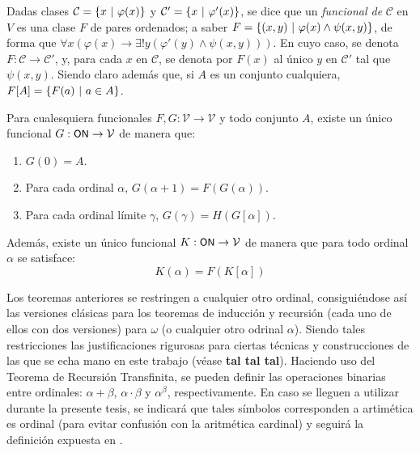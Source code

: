     Dadas clases $\mathcal{C}=\{x \text{ $|$ } \varphi(x)\}$ y $\mathcal{C}'=\{x \text{ $|$ } \varphi'(x)\}$, se dice que un \textit{funcional de} $\mathcal{C}$ en $V$ es una clase $F$ de pares ordenados; a saber $F=\{(x,y) \text{ $|$ } \varphi(x) \land \psi(x,y)\}$, de forma que $\forall x (\varphi(x)\to \exists! y (\varphi'(y) \land \psi(x,y))) $. En cuyo caso, se denota $F:\mathcal{C} \to \mathcal{C}'$, y, para cada $x$ en $\mathcal{C}$, se denota por $F(x)$ al único $y$ en $\mathcal{C}'$ tal que $\psi(x,y)$. Siendo claro además que, si $A$ es un conjunto cualquiera, $F[A]=\{F(a) \text{ $|$ } a \in A\}$.

    \begin{teorema}
        Para cualesquiera funcionales $F,G:\mathcal{V} \to \mathcal{V}$ y todo conjunto $A$, existe un único funcional $G:\text{\textsf{\small ON}} \to \mathcal{V}$ de manera que:
        \begin{enumerate}
            \item $G(0)=A$.
            \item Para cada ordinal $\alpha$, $G(\alpha+1)=F(G(\alpha))$.
            \item Para cada ordinal límite $\gamma$, $G(\gamma)=H(G[\alpha])$.
        \end{enumerate}

        Además, existe un único funcional $K:\text{\textsf{\small ON}} \to \mathcal{V}$ de manera que para todo ordinal $\alpha$ se satisface:
        \[ K(\alpha)=F(K[\alpha]) \]
    \end{teorema}

    Los teoremas anteriores se restringen a cualquier otro ordinal, consiguiéndose así las versiones clásicas para los teoremas de inducción y recursión (cada uno de ellos con dos versiones) para $\omega$ (o cualquier otro odrinal $\alpha$). Siendo tales restricciones las justificaciones rigurosas para ciertas técnicas y construcciones de las que se echa mano en este trabajo (véase \textbf{tal tal tal}).
    \index[sym]{$\alpha + \beta$}\index[sym]{$\alpha \cdot \beta$}\index[sym]{$\alpha ^ \beta$}
    Haciendo uso del Teorema de Recursión Transfinita, se pueden definir las operaciones binarias entre ordinales: $\alpha + \beta$, $\alpha \cdot \beta$ y $\alpha ^ \beta$, respectivamente. En caso se lleguen a utilizar durante la presente tesis, se indicará que tales símbolos corresponden a artimética es ordinal (para evitar confusión con la aritmética cardinal) y seguirá la definición expuesta en \cite[p.XXX]{amorIntermedio}.

